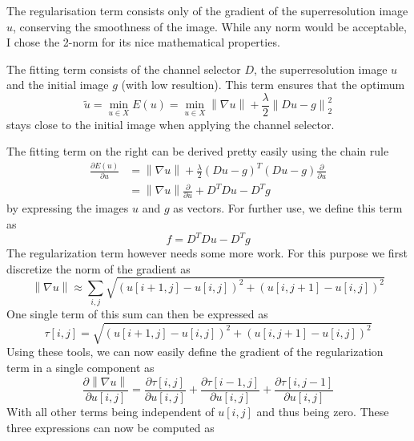 \documentclass{paper}
\newcommand{\norm}[1]{\left\lVert#1\right\rVert}
\begin{document}
The regularisation term consists only of the gradient
of the superresolution image $u$, conserving the smoothness of the image.
While any norm would be acceptable, I chose the 2-norm for its nice
mathematical properties.

The fitting term consists of the channel selector $D$, 
the superresolution image $u$ and the initial image $g$ (with low resultion).
This term ensures that the optimum
\begin{equation}
\tilde{u} = \min_{u \in X} E(u) = \min_{u \in X} \norm{\nabla u} + \frac{\lambda}{2} \norm{Du - g}^2_2
\end{equation}
stays close to the initial
image when applying the channel selector. 

The fitting term on the right can be derived pretty easily using the chain rule
\begin{align}
\frac{\partial E(u)}{\partial u} 
&= \norm{\nabla u} + \frac{\lambda}{2} (Du - g)^T(Du - g) \frac{\partial}{\partial u} \\
&= \norm{\nabla u} \frac{\partial}{\partial u} + D^T D u - D^T g
\end{align}
by expressing the images $u$ and $g$ as vectors. For further use, we define
this term as 
\begin{equation}
 f = D^T D u - D^T g
\end{equation}
The regularization term however needs some more work. 
For this purpose we first discretize the norm of the gradient as
\begin{equation}
\norm{\nabla u} \approx \sum_{i,j} 
	\sqrt{(u[i+1,j] - u[i,j])^2 + (u[i, j+1] - u[i, j])^2}
\end{equation}
One single term of this sum can then be expressed as
\begin{equation}
\tau[i,j] = \sqrt{(u[i+1,j] - u[i,j])^2 + (u[i, j+1] - u[i, j])^2}
\end{equation}
Using these tools, we can now easily define the gradient of the regularization term in a single component as
\begin{equation}
\frac{\partial \norm{\nabla u}}{\partial u[i,j]} = 
	\frac{\partial \tau[i,j]}{\partial u[i,j]} +
	\frac{\partial \tau[i - 1,j]}{\partial u[i,j]} +
	\frac{\partial \tau[i,j - 1]}{\partial u[i,j]}
\end{equation}
With all other terms being independent of $u[i,j]$ and thus being zero.
These three expressions can now be computed as
\end{document}
